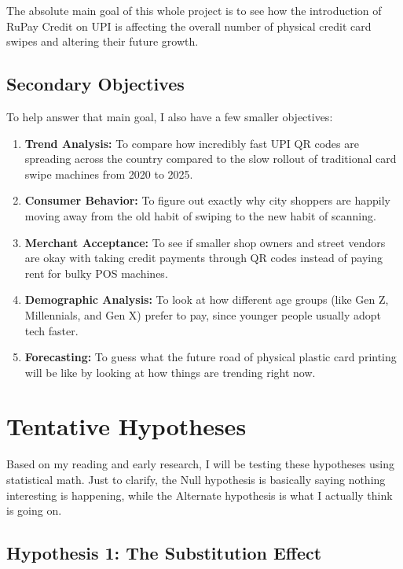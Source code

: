 The absolute main goal of this whole project is to see how the introduction of RuPay Credit on UPI is affecting the overall number of physical credit card swipes and altering their future growth.

\subsection{Secondary Objectives}

To help answer that main goal, I also have a few smaller objectives:

\begin{enumerate}
    \item \textbf{Trend Analysis:} To compare how incredibly fast UPI QR codes are spreading across the country compared to the slow rollout of traditional card swipe machines from 2020 to 2025.
    \item \textbf{Consumer Behavior:} To figure out exactly why city shoppers are happily moving away from the old habit of swiping to the new habit of scanning.
    \item \textbf{Merchant Acceptance:} To see if smaller shop owners and street vendors are okay with taking credit payments through QR codes instead of paying rent for bulky POS machines.
    \item \textbf{Demographic Analysis:} To look at how different age groups (like Gen Z, Millennials, and Gen X) prefer to pay, since younger people usually adopt tech faster.
    \item \textbf{Forecasting:} To guess what the future road of physical plastic card printing will be like by looking at how things are trending right now.
\end{enumerate}

\section{Tentative Hypotheses}

Based on my reading and early research, I will be testing these hypotheses using statistical math. Just to clarify, the Null hypothesis is basically saying nothing interesting is happening, while the Alternate hypothesis is what I actually think is going on.

\subsection{Hypothesis 1: The Substitution Effect}

